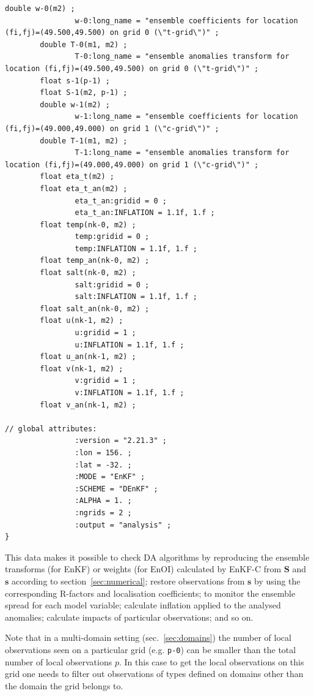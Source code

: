 \documentclass[11pt]{report}
\newcommand{\mb} {\mathbf}
\begin{document}
\begin{Verbatim}[frame=single,fontsize=\footnotesize]
        double w-0(m2) ;
                w-0:long_name = "ensemble coefficients for location (fi,fj)=(49.500,49.500) on grid 0 (\"t-grid\")" ;
        double T-0(m1, m2) ;
                T-0:long_name = "ensemble anomalies transform for location (fi,fj)=(49.500,49.500) on grid 0 (\"t-grid\")" ;
        float s-1(p-1) ;
        float S-1(m2, p-1) ;
        double w-1(m2) ;
                w-1:long_name = "ensemble coefficients for location (fi,fj)=(49.000,49.000) on grid 1 (\"c-grid\")" ;
        double T-1(m1, m2) ;
                T-1:long_name = "ensemble anomalies transform for location (fi,fj)=(49.000,49.000) on grid 1 (\"c-grid\")" ;
        float eta_t(m2) ;
        float eta_t_an(m2) ;
                eta_t_an:gridid = 0 ;
                eta_t_an:INFLATION = 1.1f, 1.f ;
        float temp(nk-0, m2) ;
                temp:gridid = 0 ;
                temp:INFLATION = 1.1f, 1.f ;
        float temp_an(nk-0, m2) ;
        float salt(nk-0, m2) ;
                salt:gridid = 0 ;
                salt:INFLATION = 1.1f, 1.f ;
        float salt_an(nk-0, m2) ;
        float u(nk-1, m2) ;
                u:gridid = 1 ;
                u:INFLATION = 1.1f, 1.f ;
        float u_an(nk-1, m2) ;
        float v(nk-1, m2) ;
                v:gridid = 1 ;
                v:INFLATION = 1.1f, 1.f ;
        float v_an(nk-1, m2) ;

// global attributes:
                :version = "2.21.3" ;
                :lon = 156. ;
                :lat = -32. ;
                :MODE = "EnKF" ;
                :SCHEME = "DEnKF" ;
                :ALPHA = 1. ;
                :ngrids = 2 ;
                :output = "analysis" ;
}
\end{Verbatim}

This data makes it possible to check DA algorithms by reproducing the ensemble transforms (for EnKF) or weights (for EnOI) calculated by EnKF-C from $\mb S$ and $\mb s$ according to section~\ref{sec:numerical}; restore observations from $\mb s$ by using the corresponding R-factors and localisation coefficients; to monitor the ensemble spread for each model variable; calculate inflation applied to the analysed anomalies; calculate impacts of particular observations; and so on.

Note that in a multi-domain setting (sec.~\ref{sec:domains}) the number of local observations seen on a particular grid (e.g. \verb|p-0|) can be smaller than the total number of local observations $p$.
In this case to get the local observations on this grid one needs to filter out observations of types defined on domains other than the domain the grid belongs to.
\end{document}
